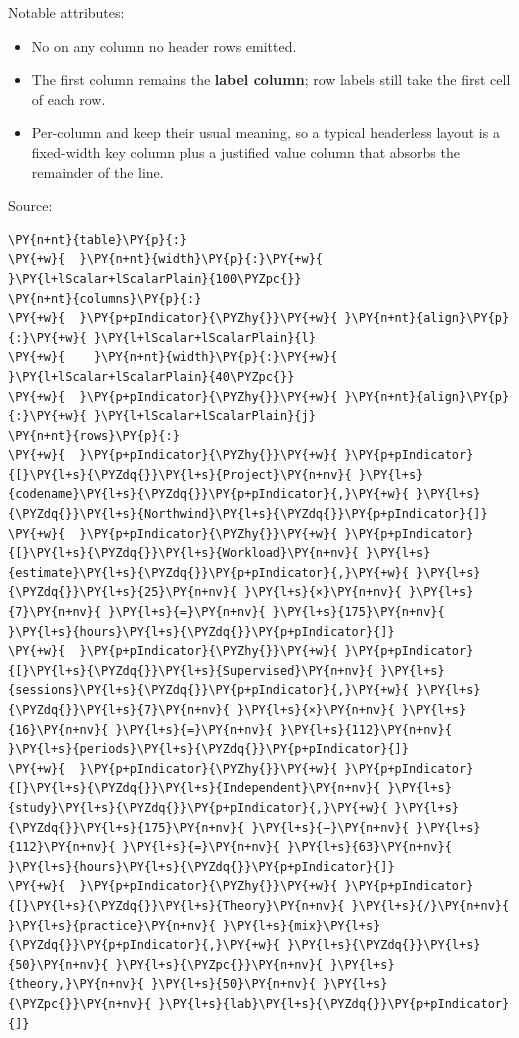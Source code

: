 \documentclass[a4paper,twoside]{article}
\begin{document}
Notable attributes:
\begin{itemize}
\item No  on any column no header rows emitted.
\item The first column remains the \textbf{label column}; row labels still take the
first cell of each row.
\item Per-column  and  keep their usual meaning, so a typical
headerless layout is a fixed-width key column plus a justified value
column that absorbs the remainder of the line.
\end{itemize}
Source:
\begin{tscode}[lang=yaml, engine=pygments]
\begin{Verbatim}[commandchars=\\\{\},breaklines, breakanywhere, commandchars=\\\{\}]
\PY{n+nt}{table}\PY{p}{:}
\PY{+w}{  }\PY{n+nt}{width}\PY{p}{:}\PY{+w}{ }\PY{l+lScalar+lScalarPlain}{100\PYZpc{}}
\PY{n+nt}{columns}\PY{p}{:}
\PY{+w}{  }\PY{p+pIndicator}{\PYZhy{}}\PY{+w}{ }\PY{n+nt}{align}\PY{p}{:}\PY{+w}{ }\PY{l+lScalar+lScalarPlain}{l}
\PY{+w}{    }\PY{n+nt}{width}\PY{p}{:}\PY{+w}{ }\PY{l+lScalar+lScalarPlain}{40\PYZpc{}}
\PY{+w}{  }\PY{p+pIndicator}{\PYZhy{}}\PY{+w}{ }\PY{n+nt}{align}\PY{p}{:}\PY{+w}{ }\PY{l+lScalar+lScalarPlain}{j}
\PY{n+nt}{rows}\PY{p}{:}
\PY{+w}{  }\PY{p+pIndicator}{\PYZhy{}}\PY{+w}{ }\PY{p+pIndicator}{[}\PY{l+s}{\PYZdq{}}\PY{l+s}{Project}\PY{n+nv}{ }\PY{l+s}{codename}\PY{l+s}{\PYZdq{}}\PY{p+pIndicator}{,}\PY{+w}{ }\PY{l+s}{\PYZdq{}}\PY{l+s}{Northwind}\PY{l+s}{\PYZdq{}}\PY{p+pIndicator}{]}
\PY{+w}{  }\PY{p+pIndicator}{\PYZhy{}}\PY{+w}{ }\PY{p+pIndicator}{[}\PY{l+s}{\PYZdq{}}\PY{l+s}{Workload}\PY{n+nv}{ }\PY{l+s}{estimate}\PY{l+s}{\PYZdq{}}\PY{p+pIndicator}{,}\PY{+w}{ }\PY{l+s}{\PYZdq{}}\PY{l+s}{25}\PY{n+nv}{ }\PY{l+s}{×}\PY{n+nv}{ }\PY{l+s}{7}\PY{n+nv}{ }\PY{l+s}{=}\PY{n+nv}{ }\PY{l+s}{175}\PY{n+nv}{ }\PY{l+s}{hours}\PY{l+s}{\PYZdq{}}\PY{p+pIndicator}{]}
\PY{+w}{  }\PY{p+pIndicator}{\PYZhy{}}\PY{+w}{ }\PY{p+pIndicator}{[}\PY{l+s}{\PYZdq{}}\PY{l+s}{Supervised}\PY{n+nv}{ }\PY{l+s}{sessions}\PY{l+s}{\PYZdq{}}\PY{p+pIndicator}{,}\PY{+w}{ }\PY{l+s}{\PYZdq{}}\PY{l+s}{7}\PY{n+nv}{ }\PY{l+s}{×}\PY{n+nv}{ }\PY{l+s}{16}\PY{n+nv}{ }\PY{l+s}{=}\PY{n+nv}{ }\PY{l+s}{112}\PY{n+nv}{ }\PY{l+s}{periods}\PY{l+s}{\PYZdq{}}\PY{p+pIndicator}{]}
\PY{+w}{  }\PY{p+pIndicator}{\PYZhy{}}\PY{+w}{ }\PY{p+pIndicator}{[}\PY{l+s}{\PYZdq{}}\PY{l+s}{Independent}\PY{n+nv}{ }\PY{l+s}{study}\PY{l+s}{\PYZdq{}}\PY{p+pIndicator}{,}\PY{+w}{ }\PY{l+s}{\PYZdq{}}\PY{l+s}{175}\PY{n+nv}{ }\PY{l+s}{−}\PY{n+nv}{ }\PY{l+s}{112}\PY{n+nv}{ }\PY{l+s}{=}\PY{n+nv}{ }\PY{l+s}{63}\PY{n+nv}{ }\PY{l+s}{hours}\PY{l+s}{\PYZdq{}}\PY{p+pIndicator}{]}
\PY{+w}{  }\PY{p+pIndicator}{\PYZhy{}}\PY{+w}{ }\PY{p+pIndicator}{[}\PY{l+s}{\PYZdq{}}\PY{l+s}{Theory}\PY{n+nv}{ }\PY{l+s}{/}\PY{n+nv}{ }\PY{l+s}{practice}\PY{n+nv}{ }\PY{l+s}{mix}\PY{l+s}{\PYZdq{}}\PY{p+pIndicator}{,}\PY{+w}{ }\PY{l+s}{\PYZdq{}}\PY{l+s}{50}\PY{n+nv}{ }\PY{l+s}{\PYZpc{}}\PY{n+nv}{ }\PY{l+s}{theory,}\PY{n+nv}{ }\PY{l+s}{50}\PY{n+nv}{ }\PY{l+s}{\PYZpc{}}\PY{n+nv}{ }\PY{l+s}{lab}\PY{l+s}{\PYZdq{}}\PY{p+pIndicator}{]}
\end{Verbatim}
\end{tscode}
\end{document}
